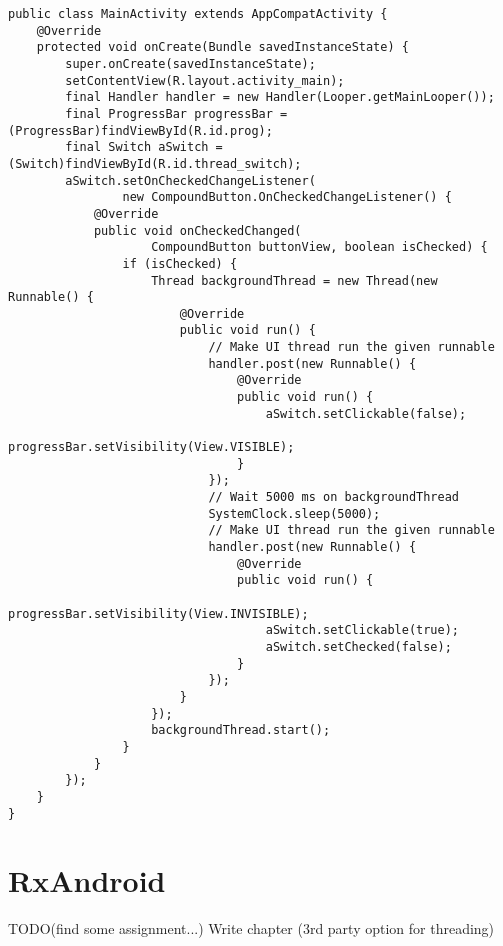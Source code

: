 \begin{lstlisting}[style=A_Java, caption={Background job with a thread and communication to UI thread with a handler}, label={listing:layoutprg}]
public class MainActivity extends AppCompatActivity {
    @Override
    protected void onCreate(Bundle savedInstanceState) {
        super.onCreate(savedInstanceState);
        setContentView(R.layout.activity_main);
        final Handler handler = new Handler(Looper.getMainLooper());
        final ProgressBar progressBar = (ProgressBar)findViewById(R.id.prog);
        final Switch aSwitch = (Switch)findViewById(R.id.thread_switch);
        aSwitch.setOnCheckedChangeListener(
                new CompoundButton.OnCheckedChangeListener() {
            @Override
            public void onCheckedChanged(
                    CompoundButton buttonView, boolean isChecked) {
                if (isChecked) {
                    Thread backgroundThread = new Thread(new Runnable() {
                        @Override
                        public void run() {
                            // Make UI thread run the given runnable
                            handler.post(new Runnable() {
                                @Override
                                public void run() {
                                    aSwitch.setClickable(false);
                                    progressBar.setVisibility(View.VISIBLE);
                                }
                            });
                            // Wait 5000 ms on backgroundThread
                            SystemClock.sleep(5000);
                            // Make UI thread run the given runnable
                            handler.post(new Runnable() {
                                @Override
                                public void run() {
                                    progressBar.setVisibility(View.INVISIBLE);
                                    aSwitch.setClickable(true);
                                    aSwitch.setChecked(false);
                                }
                            });
                        }
                    });
                    backgroundThread.start();
                }
            }
        });
    }
}
\end{lstlisting}

\section{RxAndroid}
{\Huge TODO(find some assignment...)}
Write chapter
(3rd party option for threading)

